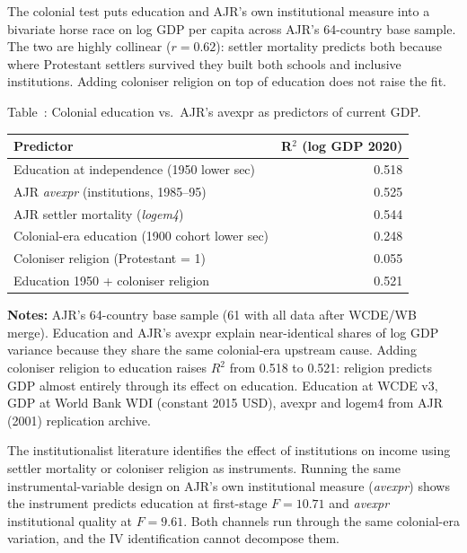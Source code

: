 \documentclass[12pt,letterpaper]{article}
\begin{document}
{\noindent The colonial test puts education and AJR's own institutional
measure into a bivariate horse race on log GDP per capita across AJR's
64-country base sample. The two are highly collinear ($r=0.62$):
settler mortality predicts both because where Protestant settlers
survived they built both schools and inclusive institutions. Adding
coloniser religion on top of education does not raise the fit.

\label{tab:a6}Table~\thetable: Colonial education vs.~AJR's avexpr as predictors of current GDP.

\begin{longtable}[]{@{}lr@{}}
\toprule
Predictor & R$^2$ (log GDP 2020) \\
\midrule
\endhead
Education at independence (1950 lower sec) & 0.518 \\
AJR \emph{avexpr} (institutions, 1985--95) & 0.525 \\
AJR settler mortality (\emph{logem4}) & 0.544 \\
Colonial-era education (1900 cohort lower sec) & 0.248 \\
Coloniser religion (Protestant = 1) & 0.055 \\
Education 1950 + coloniser religion & 0.521 \\
\bottomrule
\end{longtable}

\begin{minipage}{\dimexpr\textwidth-2em}
\scriptsize
\textbf{Notes:} AJR's 64-country base sample (61 with all data after
WCDE/WB merge). Education and AJR's avexpr explain near-identical
shares of log GDP variance because they share the same colonial-era
upstream cause. Adding coloniser religion to education raises $R^2$
from 0.518 to 0.521: religion predicts GDP almost entirely through its
effect on education. Education at WCDE v3, GDP at World Bank WDI
(constant 2015 USD), avexpr and logem4 from AJR (2001) replication
archive.
\end{minipage}

\noindent The institutionalist literature identifies the effect of
institutions on income using settler mortality or coloniser religion
as instruments. Running the same instrumental-variable design on AJR's
own institutional measure (\emph{avexpr}) shows the instrument
predicts education at first-stage $F=10.71$ and \emph{avexpr}
institutional quality at $F=9.61$. Both channels run through the same
colonial-era variation, and the IV identification cannot decompose
them.

}
\end{document}
